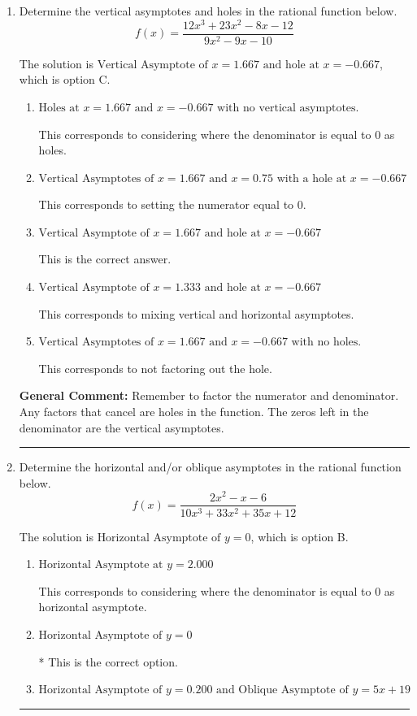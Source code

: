 \documentclass{extbook}[14pt]
\newcommand{\litem}[1]{\item #1

\rule{\textwidth}{0.4pt}}
\begin{document}
\begin{enumerate}\litem{
Determine the vertical asymptotes and holes in the rational function below.
\[ f(x) = \frac{12x^{3} +23 x^{2} -8 x -12}{9x^{2} -9 x -10} \]

The solution is \( \text{Vertical Asymptote of } x = 1.667 \text{ and hole at } x = -0.667 \), which is option C.\begin{enumerate}[label=\Alph*.]
\item \( \text{Holes at } x = 1.667 \text{ and } x = -0.667 \text{ with no vertical asymptotes.} \)

This corresponds to considering where the denominator is equal to 0 as holes.
\item \( \text{Vertical Asymptotes of } x = 1.667 \text{ and } x = 0.75 \text{ with a hole at } x = -0.667 \)

This corresponds to setting the numerator equal to 0.
\item \( \text{Vertical Asymptote of } x = 1.667 \text{ and hole at } x = -0.667 \)

This is the correct answer.
\item \( \text{Vertical Asymptote of } x = 1.333 \text{ and hole at } x = -0.667 \)

This corresponds to mixing vertical and horizontal asymptotes.
\item \( \text{Vertical Asymptotes of } x = 1.667 \text{ and } x = -0.667 \text{ with no holes.} \)

This corresponds to not factoring out the hole.
\end{enumerate}

\textbf{General Comment:} Remember to factor the numerator and denominator. Any factors that cancel are holes in the function. The zeros left in the denominator are the vertical asymptotes.
}
\litem{
Determine the horizontal and/or oblique asymptotes in the rational function below.
\[ f(x) = \frac{2x^{2} -x -6}{10x^{3} +33 x^{2} +35 x + 12} \]

The solution is \( \text{Horizontal Asymptote of } y = 0 \), which is option B.\begin{enumerate}[label=\Alph*.]
\item \( \text{Horizontal Asymptote at } y = 2.000 \)

This corresponds to considering where the denominator is equal to 0 as horizontal asymptote.
\item \( \text{Horizontal Asymptote of } y = 0 \)

* This is the correct option.
\item \( \text{Horizontal Asymptote of } y = 0.200 \text{ and Oblique Asymptote of } y = 5x + 19 \)


\end{enumerate}}
\end{enumerate}
\end{document}

